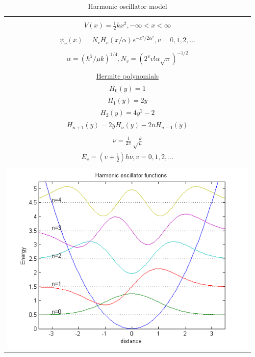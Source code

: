 \documentclass[11pt]{article}
\begin{document}
\begin{table}[]
   \begin{center}
   \caption{Harmonic oscillator model}
    \label{Harmonic-oscillator}
\begin{tabular}[h]{|c|}
\hline
 \\
$\displaystyle       V(x) = \frac{1}{2} k x^2, -\infty < x < \infty $ \\
 \\
$\displaystyle     \psi_v(x) = N_v H_v(x/\alpha)e^{-x^2/2\alpha^2}, v = 0, 1, 2, \ldots $ \\
\\
$\displaystyle \alpha=(\hbar^2/\mu k)^{1/4}, N_v=(2^vv!\alpha\sqrt{\pi})^{-1/2} $ \\
 \\
\underline{Hermite polynomials} \\
$\displaystyle H_0(y) =1$\\
$\displaystyle H_1(y) = 2y$\\
$\displaystyle H_2(y) = 4y^2-2$\\
$\displaystyle H_{n+1}(y) = 2 y H_n(y) -2 n H_{n-1}(y)$\\
 \\
$\displaystyle     \nu =\frac{1}{2\pi}\sqrt\frac{k}{\mu}$ \\
$\displaystyle     E_v=(v+\frac{1}{2})h \nu, v=0, 1, 2, ...$ \\
 \\
     \includegraphics[scale=.6]{Images/HO} \\       
\hline
\end{tabular}
 \end{center}
\end{table}
\end{document}
